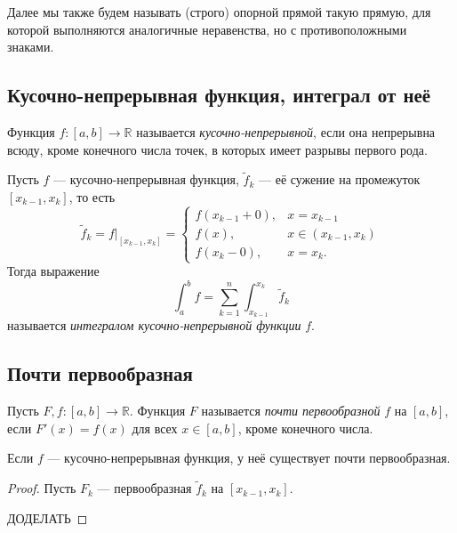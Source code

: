 \begin{remark}
	Далее мы также будем называть (строго) опорной прямой такую прямую, для которой выполняются аналогичные неравенства, но с противоположными знаками.
\end{remark}

\subsection{Кусочно-непрерывная функция, интеграл от неё}

\begin{ndefinition}
	Функция \(f \colon [a, b] \to \mathbb{R}\) называется \textit{кусочно-непрерывной}, если она непрерывна всюду, кроме конечного числа точек, в которых имеет разрывы первого рода.
\end{ndefinition}

\begin{ndefinition}
	Пусть \(f\) --- кусочно-непрерывная функция, \(\widetilde{f}_k\) --- её сужение на промежуток \([x_{k - 1}, x_k]\), то есть \[
	\widetilde{f}_k = f \big|_{[x_{k - 1}, x_k]} =
	\begin{cases}
		f(x_{k - 1} + 0), & x = x_{k - 1} 		   \\
		f(x),			  & x \in (x_{k - 1}, x_k) \\
		f(x_k - 0),		  & x = x_k.
	\end{cases}
	\]
	Тогда выражение \[
	\int_a^b f = \sum_{k = 1}^n \int_{x_{k - 1}}^{x_k} \widetilde{f}_k
	\]
	называется \textit{интегралом кусочно-непрерывной функции} \(f\).
\end{ndefinition}

\subsection{Почти первообразная}

\begin{definition}
	Пусть \(F, f \colon [a, b] \to \mathbb{R}\). Функция \(F\) называется \textit{почти первообразной} \(f\) на \([a, b]\), если \(F'(x) = f(x)\) для всех \(x \in [a, b]\), кроме конечного числа.
\end{definition}

\begin{nremark}
	Если \(f\) --- кусочно-непрерывная функция, у неё существует почти первообразная.
\end{nremark}
\begin{proof}
	Пусть \(F_k\) --- первообразная \(\widetilde{f}_k\) на \([x_{k - 1}, x_k]\).
	
	ДОДЕЛАТЬ
\end{proof}

